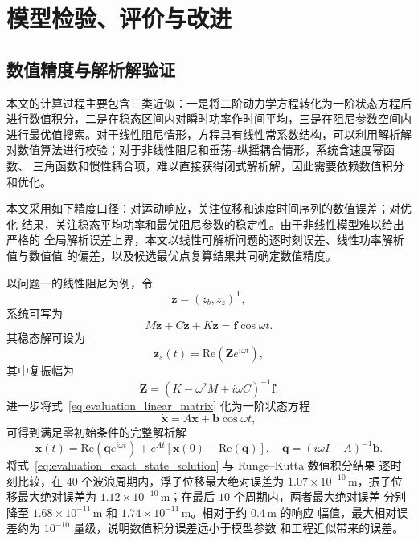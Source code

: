 \section{模型检验、评价与改进}

\subsection{数值精度与解析解验证}

本文的计算过程主要包含三类近似：一是将二阶动力学方程转化为一阶状态方程后
进行数值积分，二是在稳态区间内对瞬时功率作时间平均，三是在阻尼参数空间内
进行最优值搜索。对于线性阻尼情形，方程具有线性常系数结构，可以利用解析解
对数值算法进行校验；对于非线性阻尼和垂荡--纵摇耦合情形，系统含速度幂函数、
三角函数和惯性耦合项，难以直接获得闭式解析解，因此需要依赖数值积分和优化。

本文采用如下精度口径：对运动响应，关注位移和速度时间序列的数值误差；对优化
结果，关注稳态平均功率和最优阻尼参数的稳定性。由于非线性模型难以给出严格的
全局解析误差上界，本文以线性可解析问题的逐时刻误差、线性功率解析值与数值值
的偏差，以及候选最优点复算结果共同确定数值精度。

以问题一的线性阻尼为例，令
\[
  \boldsymbol z=(z_b,z_z)^\mathsf{T},
\]
系统可写为
\begin{equation}
  M\ddot{\boldsymbol z}+C\dot{\boldsymbol z}+K\boldsymbol z
  =\boldsymbol f\cos\omega t .
  \label{eq:evaluation_linear_matrix}
\end{equation}
其稳态解可设为
\[
  \boldsymbol z_s(t)=
  \mathrm{Re}\left(\boldsymbol Z e^{i\omega t}\right),
\]
其中复振幅为
\begin{equation}
  \boldsymbol Z=
  \left(K-\omega^2M+i\omega C\right)^{-1}\boldsymbol f .
  \label{eq:evaluation_complex_amplitude}
\end{equation}
进一步将式~\eqref{eq:evaluation_linear_matrix} 化为一阶状态方程
\[
  \dot{\boldsymbol x}=A\boldsymbol x+\boldsymbol b\cos\omega t,
\]
可得到满足零初始条件的完整解析解
\begin{equation}
  \boldsymbol x(t)=
  \mathrm{Re}\left(\boldsymbol q e^{i\omega t}\right)
  +e^{At}\left[\boldsymbol x(0)-\mathrm{Re}(\boldsymbol q)\right],
  \quad
  \boldsymbol q=(i\omega I-A)^{-1}\boldsymbol b .
  \label{eq:evaluation_exact_state_solution}
\end{equation}
将式~\eqref{eq:evaluation_exact_state_solution} 与 Runge--Kutta 数值积分结果
逐时刻比较，在 $40$ 个波浪周期内，浮子位移最大绝对误差为
$1.07\times10^{-10}\,\mathrm{m}$，振子位移最大绝对误差为
$1.12\times10^{-10}\,\mathrm{m}$；在最后 $10$ 个周期内，两者最大绝对误差
分别降至 $1.68\times10^{-11}\,\mathrm{m}$ 和
$1.74\times10^{-11}\,\mathrm{m}$。相对于约 $0.4\,\mathrm{m}$ 的响应
幅值，最大相对误差约为 $10^{-10}$ 量级，说明数值积分误差远小于模型参数
和工程近似带来的误差。

